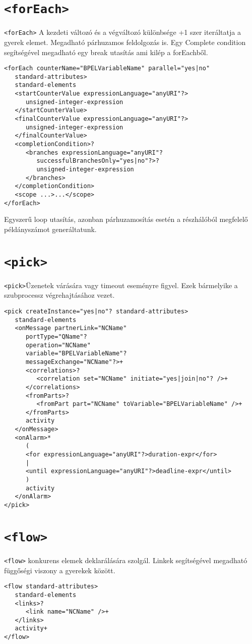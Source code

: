 \section{\texttt{<forEach>}}
\texttt{<forEach>} A kezdeti változó és a végváltozó különbsége +1 szer iteráltatja a gyerek elemet. Megadható párhuzamos feldolgozás is. Egy Complete condition segítségével megadható egy break utasítás ami kilép a forEachből. 
\begin{verbatim}
<forEach counterName="BPELVariableName" parallel="yes|no"
   standard-attributes>
   standard-elements
   <startCounterValue expressionLanguage="anyURI"?>
      unsigned-integer-expression
   </startCounterValue>
   <finalCounterValue expressionLanguage="anyURI"?>
      unsigned-integer-expression
   </finalCounterValue>
   <completionCondition>?
      <branches expressionLanguage="anyURI"?
         successfulBranchesOnly="yes|no"?>?
         unsigned-integer-expression
      </branches>
   </completionCondition>
   <scope ...>...</scope>
</forEach>
\end{verbatim} Egyszerű loop utasítás, azonban párhuzamosítás esetén a részhálóból megfelelő példányszámot generáltatunk. 

\section{\texttt{<pick>}}
\texttt{<pick>}Üzenetek várására vagy timeout eseményre figyel. Ezek bármelyike a szubprocessz végrehajtásához vezet. 
\begin{verbatim}
<pick createInstance="yes|no"? standard-attributes>
   standard-elements
   <onMessage partnerLink="NCName"
      portType="QName"?
      operation="NCName"
      variable="BPELVariableName"?
      messageExchange="NCName"?>+
      <correlations>?
         <correlation set="NCName" initiate="yes|join|no"? />+
      </correlations>
      <fromParts>?
         <fromPart part="NCName" toVariable="BPELVariableName" />+
      </fromParts>
      activity
   </onMessage>
   <onAlarm>*
      (
      <for expressionLanguage="anyURI"?>duration-expr</for>
      |
      <until expressionLanguage="anyURI"?>deadline-expr</until>
      )
      activity
   </onAlarm>
</pick>
\end{verbatim}

\section{\texttt{<flow>}}
\texttt{<flow>} konkurens elemek deklarálására szolgál. Linkek segítségével megadható függőségi viszony a gyerekek között. 
\begin{verbatim}
<flow standard-attributes>
   standard-elements
   <links>?
      <link name="NCName" />+
   </links>
   activity+
</flow>
\end{verbatim} 

